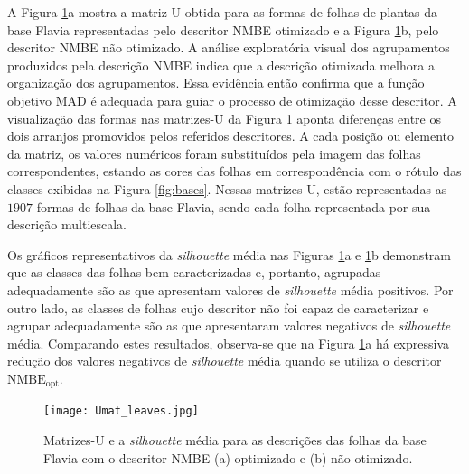 A Figura \ref{fig:MatrizU_leaves_256}a mostra a matriz-U obtida para as formas de folhas de plantas da base Flavia representadas pelo descritor \ac{NMBE} otimizado e a Figura \ref{fig:MatrizU_leaves_256}b, pelo descritor \ac{NMBE} não otimizado. A análise exploratória visual dos agrupamentos produzidos pela descrição \ac{NMBE} indica que a descrição otimizada melhora a organização dos agrupamentos. Essa evidência então confirma que a função objetivo \ac{MAD} é adequada para guiar o processo de otimização desse descritor. A visualização das formas nas matrizes-U da Figura \ref{fig:MatrizU_leaves_256}  aponta diferenças entre os dois arranjos promovidos pelos referidos descritores. A cada posição ou elemento da matriz, os valores numéricos foram substituídos pela imagem das folhas correspondentes, estando as cores das folhas em correspondência com o rótulo das classes exibidas na Figura \ref{fig:bases}. Nessas matrizes-U,  estão representadas as $1907$ formas de folhas da base Flavia, sendo cada folha representada por sua descrição multiescala.

Os gráficos representativos da \emph{silhouette} média nas Figuras \ref{fig:MatrizU_leaves_256}a  e \ref{fig:MatrizU_leaves_256}b demonstram que as classes das folhas bem caracterizadas e, portanto, agrupadas adequadamente são as que apresentam valores de \emph{silhouette} média positivos. Por outro lado, as classes de folhas cujo descritor não foi capaz de caracterizar e agrupar adequadamente são as que apresentaram valores negativos de \emph{silhouette} média. Comparando estes resultados, observa-se que na Figura \ref{fig:MatrizU_leaves_256}a há expressiva redução dos valores negativos de \emph{silhouette} média quando se utiliza o descritor $\operatorname{NMBE_{opt}}$. 

\begin{figure}[t]

\caption{\label{fig:MatrizU_leaves_256} Matrizes-U e a \emph{silhouette} média para as descrições das folhas da base Flavia com o descritor \ac{NMBE} (a) optimizado e (b) não otimizado.}
\centering
\texttt{[image: Umat\_leaves.jpg]}

\end{figure}


